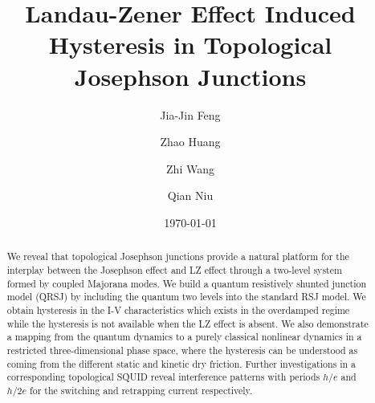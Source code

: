 \documentclass[aps,prl,twocolumn,showpacs,showpacs,10pt,superscriptaddress]{revtex4-1}
\begin{document}
\title{Landau-Zener Effect Induced Hysteresis in Topological Josephson Junctions}


\author{Jia-Jin Feng}

\author{Zhao Huang}

\author{Zhi Wang}

\author{Qian Niu}


\begin{abstract}
We reveal that topological Josephson junctions provide a natural platform for the interplay between the Josephson effect and LZ effect through a two-level system formed by coupled Majorana modes. We build a quantum resistively shunted junction model (QRSJ) by including the quantum two levels into the standard RSJ model. We obtain hysteresis in the I-V characteristics which exists in the overdamped regime while the hysteresis is not available when the LZ effect is absent. We also demonstrate a mapping from the quantum dynamics to a purely classical nonlinear dynamics in a restricted three-dimensional phase space, where the hysteresis can be understood as coming from the different static and kinetic dry friction. Further investigations in a corresponding topological SQUID reveal interference patterns with periods $h/e$ and $h/2e$ for the switching and retrapping current respectively.
\end{abstract}
\date{\today}
\maketitle

\end{document}
